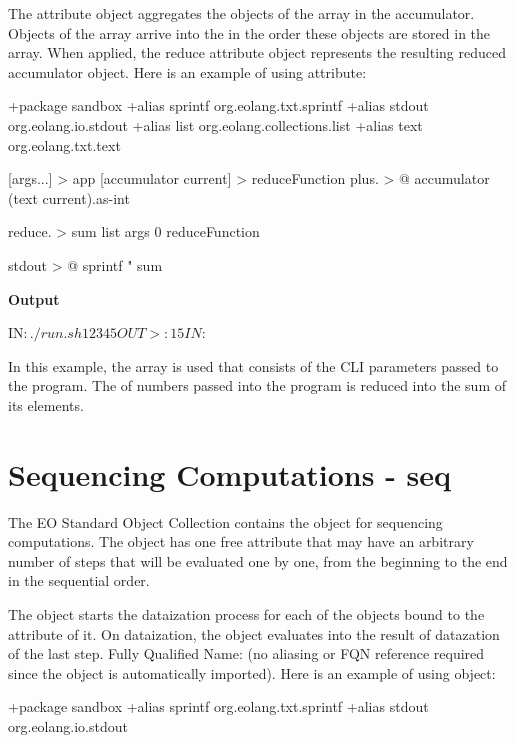 \documentclass[12pt]{book}
\begin{document}
{{{The  attribute object aggregates the objects of the array in the accumulator. Objects of the array arrive into the  in the order these objects are stored in the array.
When applied, the reduce attribute object represents the resulting reduced accumulator object. Here is an example of using  attribute:

\begin{ffcode}
+package sandbox
+alias sprintf org.eolang.txt.sprintf
+alias stdout org.eolang.io.stdout
+alias list org.eolang.collections.list
+alias text org.eolang.txt.text

[args...] > app
  [accumulator current] > reduceFunction
    plus. > @
      accumulator
      (text current).as-int

  reduce. > sum
    list args
    0
    reduceFunction

  stdout > @
    sprintf
      "%
      sum

\end{ffcode}
\textbf{Output}
\begin{ffcode}

IN$: ./run.sh 1 2 3 4 5
OUT>: 15
IN$: 
\end{ffcode}

In this example, the  array is used that consists of the CLI parameters passed to the program. The  of numbers passed into the program is reduced into the sum of its elements.

\section{Sequencing Computations - seq}
The EO Standard Object Collection contains the  object for sequencing computations.
The  object has one free attribute  that may have an arbitrary number of steps that will be evaluated one by one, from the beginning to the end in the sequential order.

The  object starts the dataization process for each of the objects bound to the  attribute of it.
On dataization, the  object evaluates into the result of datazation of the last step.
Fully Qualified Name:  (no aliasing or FQN reference required since the object is automatically imported). Here is an example of using  object:

\begin{ffcode}
+package sandbox
+alias sprintf org.eolang.txt.sprintf
+alias stdout org.eolang.io.stdout


\end{ffcode}}}}
\end{document}
